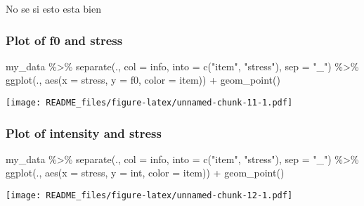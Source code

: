 \documentclass[
]{article}
\newenvironment{Shaded}{\begin{snugshade}}{\end{snugshade}}
\newcommand{\AttributeTok}[1]{\textcolor[rgb]{0.77,0.63,0.00}{#1}}
\newcommand{\FunctionTok}[1]{\textcolor[rgb]{0.00,0.00,0.00}{#1}}
\newcommand{\NormalTok}[1]{#1}
\newcommand{\SpecialCharTok}[1]{\textcolor[rgb]{0.00,0.00,0.00}{#1}}
\newcommand{\StringTok}[1]{\textcolor[rgb]{0.31,0.60,0.02}{#1}}
\begin{document}
No se si esto esta bien

\hypertarget{plot-of-f0-and-stress}{%
\subsubsection{Plot of f0 and stress}\label{plot-of-f0-and-stress}}

\begin{Shaded}
\begin{Highlighting}[]
\NormalTok{my\_data }\SpecialCharTok{\%\textgreater{}\%} 
  \FunctionTok{separate}\NormalTok{(., }\AttributeTok{col =}\NormalTok{ info, }\AttributeTok{into =} \FunctionTok{c}\NormalTok{(}\StringTok{"item"}\NormalTok{, }\StringTok{"stress"}\NormalTok{), }\AttributeTok{sep =} \StringTok{"\_"}\NormalTok{) }\SpecialCharTok{\%\textgreater{}\%}
  \FunctionTok{ggplot}\NormalTok{(., }\FunctionTok{aes}\NormalTok{(}\AttributeTok{x =}\NormalTok{ stress, }\AttributeTok{y =}\NormalTok{ f0, }\AttributeTok{color =}\NormalTok{ item)) }\SpecialCharTok{+}
    \FunctionTok{geom\_point}\NormalTok{() }
\end{Highlighting}
\end{Shaded}

\texttt{[image: README\_files/figure-latex/unnamed-chunk-11-1.pdf]}

\hypertarget{plot-of-intensity-and-stress}{%
\subsubsection{Plot of intensity and
stress}\label{plot-of-intensity-and-stress}}

\begin{Shaded}
\begin{Highlighting}[]
\NormalTok{my\_data }\SpecialCharTok{\%\textgreater{}\%} 
  \FunctionTok{separate}\NormalTok{(., }\AttributeTok{col =}\NormalTok{ info, }\AttributeTok{into =} \FunctionTok{c}\NormalTok{(}\StringTok{"item"}\NormalTok{, }\StringTok{"stress"}\NormalTok{), }\AttributeTok{sep =} \StringTok{"\_"}\NormalTok{) }\SpecialCharTok{\%\textgreater{}\%}
  \FunctionTok{ggplot}\NormalTok{(., }\FunctionTok{aes}\NormalTok{(}\AttributeTok{x =}\NormalTok{ stress, }\AttributeTok{y =}\NormalTok{ int, }\AttributeTok{color =}\NormalTok{ item)) }\SpecialCharTok{+}
    \FunctionTok{geom\_point}\NormalTok{() }
\end{Highlighting}
\end{Shaded}

\texttt{[image: README\_files/figure-latex/unnamed-chunk-12-1.pdf]}
\end{document}

